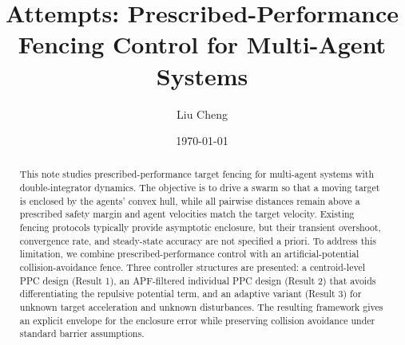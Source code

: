 \documentclass[twocolumn]{article}
\title{Attempts: Prescribed-Performance Fencing Control for Multi-Agent Systems}
\author{Liu Cheng}
\date{\today}
\begin{document}
\maketitle

\begin{abstract}
This note studies prescribed-performance target fencing for multi-agent
systems with double-integrator dynamics.  The objective is to drive a swarm
so that a moving target is enclosed by the agents' convex hull, while all
pairwise distances remain above a prescribed safety margin and agent
velocities match the target velocity.  Existing fencing protocols typically
provide asymptotic enclosure, but their transient overshoot, convergence
rate, and steady-state accuracy are not specified a priori.  To address this
limitation, we combine prescribed-performance control with an
artificial-potential collision-avoidance fence.  Three controller structures
are presented: a centroid-level PPC design (Result 1), an APF-filtered
individual PPC design (Result 2) that avoids differentiating the repulsive
potential term, and an adaptive variant (Result 3) for unknown target
acceleration and unknown disturbances.
The resulting framework gives an explicit envelope for the enclosure error
while preserving collision avoidance under standard barrier assumptions.
\end{abstract}



\clearpage

\clearpage

\clearpage

\clearpage



    
	
\end{document}
